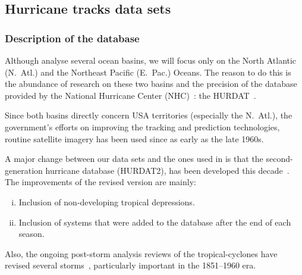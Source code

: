 \subsection{Hurricane tracks data sets}\label{sec:hurdat}

\subsubsection{Description of the database}\label{ssec:hurdat-intro}
Although \citeauthor{Corral2010} analyse several ocean basins, we will focus only on the North Atlantic (N.~Atl.) and the Northeast Pacific (E.~Pac.) Oceans. The reason to do this is the abundance of research on these two basins and the precision of the database provided by the National Hurricane Center (NHC)~\cite{o:NHC}: the HURDAT~\cite{o:hurdat2}.

Since both basins directly concern USA territories (especially the N.~Atl.), the government's efforts on improving the tracking and prediction technologies, routine satellite imagery has been used since as early as the late 1960s.

A major change between our data sets and the ones used in \cite{Corral2010} is that the second-generation hurricane database (HURDAT2), has been developed this decade~\cite{Landsea2013}. The improvements of the revised version are mainly:
\begin{enumerate}[(i)]
	\item Inclusion of non-developing tropical depressions.
	\item Inclusion of systems that were added to the database after the end of each season.
\end{enumerate}
Also, the ongoing post-storm analysis reviews of the tropical-cyclones have revised several storms~\cite{o:hurdat-comparison}, particularly important in the 1851--1960 era.

